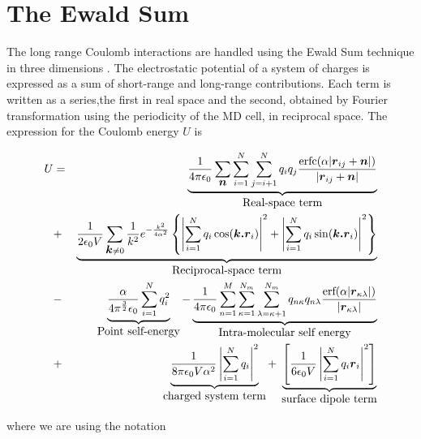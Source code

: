 \section{The Ewald Sum}
\label{sec:ewald}
The long range Coulomb interactions are handled using the Ewald Sum
technique in three dimensions \cite[p.\ 156]{berthaut:52,allen:87}.
The electrostatic potential of a system of charges is expressed as a
sum of short-range and long-range contributions.  Each term is written
as a series,the first in real space and the second, obtained by
Fourier transformation using the periodicity of the MD cell, in
reciprocal space.  The expression for the Coulomb energy $U$ is

\begin{eqnarray}
\label{eqn:ewald}
U & = &  \underbrace{\frac{1}{4 \pi \epsilon_0}
\sum_{\mbox{\boldmath \protect\(n\protect\)}} \sum_{i=1}^{N} \sum_{j=i+1}^{N} q_iq_j
\frac{\mbox{erfc}( \alpha | \mbox{\boldmath \protect\(r\protect\)}_{ij} +  \mbox{\boldmath \protect\(n\protect\)} |)}{ | \mbox{\boldmath \protect\(r\protect\)}_{ij} +
\mbox{\boldmath \protect\(n\protect\)} | }}_{\mbox{Real-space term}} 
\nonumber \\
 & + & \underbrace{\frac{1}{2 \epsilon_0 V} \sum_{\mbox{\boldmath \protect\(k\protect\)} \ne 0} \frac{1}{k^2}
       e^{-\frac{k^2}{4 \alpha^2}} 
\left \lbrace 
\left | \sum_{i=1}^{N} q_i \cos(\mbox{\boldmath \protect\(k.r\protect\)}_i) \right |^2 + 
\left | \sum_{i=1}^{N} q_i \sin(\mbox{\boldmath \protect\(k.r\protect\)}_i) \right |^2 
\right \rbrace}_{\mbox{Reciprocal-space term}}\\
 & - & 
\underbrace{\frac{\alpha}{4 \pi^\frac{3}{2} \epsilon_0} 
\sum_{i=1}^{N} q_i^2}_{\mbox{Point self-energy}} 
 - \underbrace{\frac{1}{4 \pi \epsilon_0} \sum_{n=1}^M
\sum_{\kappa=1}^{N_m} \sum_{\lambda=\kappa+1}^{N_m} q_{n\kappa} q_{n\lambda}
\frac{\mbox{erf}( \alpha | \mbox{\boldmath \protect\(r\protect\)}_{\kappa\lambda} |)}{ |
\mbox{\boldmath \protect\(r\protect\)}_{\kappa\lambda}| }}_{\mbox{Intra-molecular self energy}}
\nonumber \\
& + & \underbrace{ \frac{1}{8 \pi \epsilon_0 V \alpha^2}
                    \left | \sum_{i=1}^N q_i 
		    \right |^2}_{\mbox{charged system term}} +
\; \underbrace{\left [  \frac{1}{6 \epsilon_0 V} 
                    \left | \sum_{i=1}^N q_i \mbox{\boldmath \protect\(r\protect\)}_i 
                    \right |^2 \right ]}_{\mbox{surface dipole term}}
\nonumber
\end{eqnarray}

where we are using the notation


